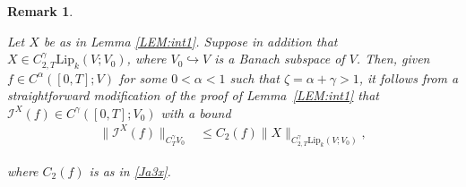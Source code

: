 \documentclass[letterpaper, 11pt,  reqno]{amsart}
\newtheorem{remark}[theorem]{Remark}
\newcommand{\1}{\hspace{0.5mm}\text{I}\hspace{0.5mm}}
\newcommand{\I}{\mathcal{I}}
\newcommand{\noi}{\noindent}
\newcommand{\al}{\alpha}
\newcommand{\g}{\gamma}
\newcommand{\Lip}{\mathrm{Lip}}
\newcommand{\z}{\zeta}
\numberwithin{equation}{section}
\numberwithin{theorem}{section}
\begin{document}
\begin{remark}\label{REM:nonlin}\rm

Let $X$ be as in Lemma \ref{LEM:int1}.
Suppose in addition that  $X\in C^\g_{2,T}\Lip_k(V; V_0)$,
 where   $V_0 \hookrightarrow V$
is a Banach subspace of $V$.
Then, given 
  $f\in C^{\al}([0,T];V)$ for some $0 < \al < 1$
  such that $\z = \al + \g > 1$, 
it follows from a straightforward modification of the proof of Lemma~\ref{LEM:int1}
that 
$\I^X(f)\in C^\g([0,T]; V_0)$
with a bound
\begin{align}
\|\I^X(f)\|_{C^\g_T  V_0} 
& \leq
C_2(f)
\|X\|_{C^\g_{2,T}\Lip_k(V; V_0)}, 
\label{Ja300}
\end{align}


\noi
where $C_2(f)$ is as in \eqref{Ja3x}.

\end{remark}
\end{document}
